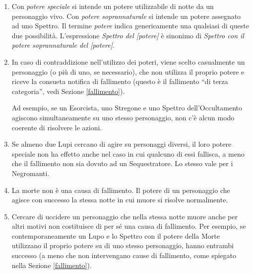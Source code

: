 \documentclass[a4paper,10pt]{article}
\begin{document}
\begin{enumerate}
	
	\item Con \emph{potere speciale} si intende un potere utilizzabile di notte da un personaggio vivo. Con \emph{potere soprannaturale} si intende un potere assegnato ad uno Spettro. Il termine \emph{potere} indica genericamente una qualsiasi di queste due possibilità. L'espressione \emph{Spettro del [potere]} è sinonimo di \emph{Spettro con il potere soprannaturale del [potere]}.
	
	\item In caso di contraddizione nell'utilizzo dei poteri, viene scelto casualmente un personaggio (o più di uno, se necessario), che non utilizza il proprio potere e riceve la consueta notifica di fallimento (questo è il fallimento ``di terza categoria'', vedi Sezione \ref{fallimento}).
 
	Ad esempio, se un Esorcista, uno Stregone e uno Spettro dell'Occultamento agiscono simultaneamente su uno stesso personaggio, non c'è alcun modo coerente di risolvere le azioni.
	
	
	\item Se almeno due Lupi cercano di agire su personaggi diversi, il loro potere speciale non ha effetto anche nel caso in cui qualcuno di essi fallisca, a meno che il fallimento non sia dovuto ad un Sequestratore. Lo stesso vale per i Negromanti.
	
	\item La morte non è una causa di fallimento. Il potere di un personaggio che agisce con successo la stessa notte in cui muore si risolve normalmente.
	
	\item Cercare di uccidere un personaggio che nella stessa notte muore anche per altri motivi non costituisce di per sé una causa di fallimento.
	Per esempio, se contemporaneamente un Lupo e lo Spettro con il potere della Morte utilizzano il proprio potere su di uno stesso personaggio, hanno entrambi successo (a meno che non intervengano cause di fallimento, come spiegato nella Sezione \ref{fallimento}).
	

\end{enumerate}
\end{document}
